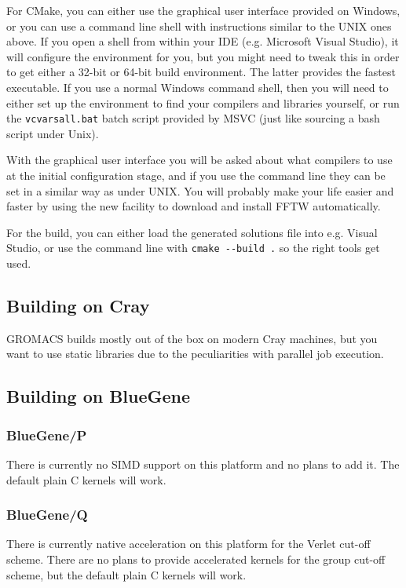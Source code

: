 \documentclass{article}[12pt,a4paper,twoside]
\newcommand{\gromacs}{GROMACS}
\newcommand{\fftw}{FFTW}
\newcommand{\cmake}{CMake}
\begin{document}
For \cmake{}, you can either use the graphical user interface provided
on Windows, or you can use a command line shell with instructions
similar to the UNIX ones above. If you open a shell from within
your IDE (e.g. Microsoft Visual Studio), it will configure the
environment for you, but you might need to tweak this in order to 
get either a 32-bit or 64-bit build environment. The latter provides the
fastest executable. If you use a normal Windows command shell, then
you will need to either set up the environment to find your compilers
and libraries yourself, or run the \verb+vcvarsall.bat+ batch script
provided by MSVC (just like sourcing a bash script under
Unix). 

With the graphical user interface you will be asked about what compilers
to use at the initial configuration stage, and if you use the command line
they can be set in a similar way as under UNIX.
You will probably make your life easier and faster by using the
new facility to download and install \fftw{} automatically. 

For the build, you can either load the generated solutions file into
e.g. Visual Studio, or use the command line with \verb+cmake --build .+ 
so the right tools get used.

\subsection{Building on Cray}

\gromacs{} builds mostly out of the box on modern Cray machines,
but you want to use static libraries due to the peculiarities with
parallel job execution.

\subsection{Building on BlueGene}

\subsubsection{BlueGene/P}

There is currently no SIMD support on this platform and no plans to
add it. The default plain C kernels will work.

\subsubsection{BlueGene/Q}

There is currently native acceleration on this platform for the Verlet
cut-off scheme. There are no plans to provide accelerated kernels for
the group cut-off scheme, but the default plain C kernels will work.
\end{document}
